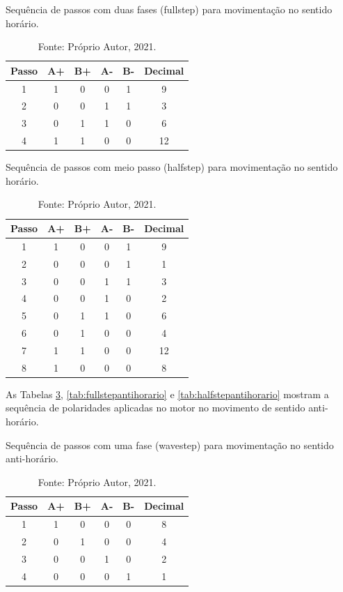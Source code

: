 \begin{table}
    \centering
    \caption{Sequência de passos com duas fases (fullstep) para movimentação no sentido horário.}
    \begin{tabular}{cccccc}
        \hline
        \textbf{Passo} & \textbf{A+} & \textbf{B+} & \textbf{A-} & \textbf{B-} & \textbf{Decimal}\\
        \hline
        1 & 1 & 0 & 0 & 1 & 9\\
        2 & 0 & 0 & 1 & 1 & 3\\
        3 & 0 & 1 & 1 & 0 & 6\\
        4 & 1 & 1 & 0 & 0 & 12\\
        \hline       
    \end{tabular}
    \caption*{Fonte: Próprio Autor, 2021.}
    \label{tab:fullstephorario}
\end{table}

\begin{table}
    \centering
    \caption{Sequência de passos com meio passo (halfstep) para movimentação no sentido horário.}
    \begin{tabular}{cccccc}
        \hline
        \textbf{Passo} & \textbf{A+} & \textbf{B+} & \textbf{A-} & \textbf{B-} & \textbf{Decimal}\\
        \hline
        1 & 1 & 0 & 0 & 1 & 9\\
        2 & 0 & 0 & 0 & 1 & 1\\
        3 & 0 & 0 & 1 & 1 & 3\\
        4 & 0 & 0 & 1 & 0 & 2\\
        5 & 0 & 1 & 1 & 0 & 6\\
        6 & 0 & 1 & 0 & 0 & 4\\
        7 & 1 & 1 & 0 & 0 & 12\\
        8 & 1 & 0 & 0 & 0 & 8\\
        \hline       
    \end{tabular}
    \caption*{Fonte: Próprio Autor, 2021.}
    \label{tab:halfstephorario}
\end{table}

As Tabelas \ref{tab:wavestepantihorario}, \ref{tab:fullstepantihorario} e \ref{tab:halfstepantihorario} 
mostram a sequência de polaridades aplicadas no motor no movimento de sentido anti-horário.

\begin{table}
    \centering
    \caption{Sequência de passos com uma fase (wavestep) para movimentação no sentido anti-horário.}
    \begin{tabular}{cccccc}
        \hline
        \textbf{Passo} & \textbf{A+} & \textbf{B+} & \textbf{A-} & \textbf{B-} & \textbf{Decimal}\\
        \hline
        1 & 1 & 0 & 0 & 0 & 8\\
        2 & 0 & 1 & 0 & 0 & 4\\
        3 & 0 & 0 & 1 & 0 & 2\\
        4 & 0 & 0 & 0 & 1 & 1\\
        \hline       
    \end{tabular}
    \caption*{Fonte: Próprio Autor, 2021.}
    \label{tab:wavestepantihorario}
\end{table}


